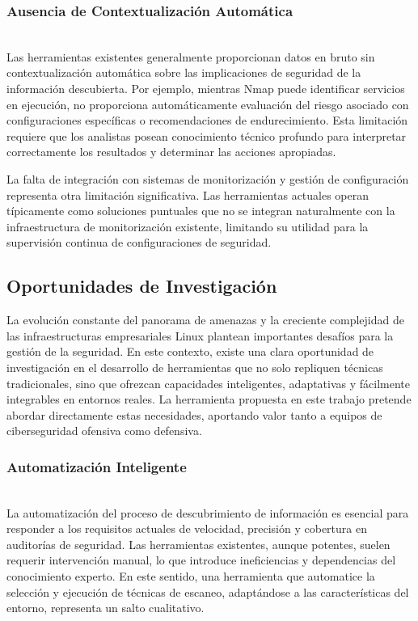 \documentclass[runningheads]{llncs}
\begin{document}
\subsubsection{Ausencia de Contextualización Automática}
\hfill\\

Las herramientas existentes generalmente proporcionan datos en bruto sin contextualización automática sobre las implicaciones de seguridad de la información descubierta. Por ejemplo, mientras Nmap puede identificar servicios en ejecución, no proporciona automáticamente evaluación del riesgo asociado con configuraciones específicas o recomendaciones de endurecimiento. Esta limitación requiere que los analistas posean conocimiento técnico profundo para interpretar correctamente los resultados y determinar las acciones apropiadas.

La falta de integración con sistemas de monitorización y gestión de configuración representa otra limitación significativa. Las herramientas actuales operan típicamente como soluciones puntuales que no se integran naturalmente con la infraestructura de monitorización existente, limitando su utilidad para la supervisión continua de configuraciones de seguridad.


\subsection{Oportunidades de Investigación}

La evolución constante del panorama de amenazas y la creciente complejidad de las infraestructuras empresariales Linux plantean importantes desafíos para la gestión de la seguridad. En este contexto, existe una clara oportunidad de investigación en el desarrollo de herramientas que no solo repliquen técnicas tradicionales, sino que ofrezcan capacidades inteligentes, adaptativas y fácilmente integrables en entornos reales. La herramienta propuesta en este trabajo pretende abordar directamente estas necesidades, aportando valor tanto a equipos de ciberseguridad ofensiva como defensiva.


\subsubsection{Automatización Inteligente}
\hfill\\

La automatización del proceso de descubrimiento de información es esencial para responder a los requisitos actuales de velocidad, precisión y cobertura en auditorías de seguridad. Las herramientas existentes, aunque potentes, suelen requerir intervención manual, lo que introduce ineficiencias y dependencias del conocimiento experto. En este sentido, una herramienta que automatice la selección y ejecución de técnicas de escaneo, adaptándose a las características del entorno, representa un salto cualitativo.
\end{document}
